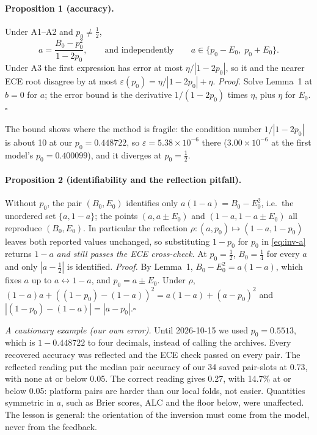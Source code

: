 \paragraph{Proposition 1 (accuracy).}
Under A1--A2 and $p_0\neq\frac12$,
\begin{equation}\label{eq:inv-a}
a=\frac{B_0-p_0^2}{1-2p_0},\qquad\text{and independently}\qquad a\in\{p_0-E_0,\;p_0+E_0\}.
\end{equation}
Under A3 the first expression has error at most $\eta/|1-2p_0|$, so it and the nearer ECE root disagree by at most
$\varepsilon(p_0)=\eta/|1-2p_0|+\eta$. \textit{Proof.} Solve Lemma~1 at $b=0$ for $a$; the error bound is the derivative
$1/(1-2p_0)$ times $\eta$, plus $\eta$ for $E_0$.\hfill$\square$

The bound shows where the method is fragile: the condition number $1/|1-2p_0|$ is about 10 at our $p_0=0.448722$,
so $\varepsilon=5.38\times10^{-6}$ there ($3.00\times10^{-6}$ at the first model's $p_0=0.400099$), and it diverges at $p_0=\frac12$.

\paragraph{Proposition 2 (identifiability and the reflection pitfall).}
Without $p_0$, the pair $(B_0,E_0)$ identifies only $a(1-a)=B_0-E_0^2$, i.e.\ the unordered set $\{a,1-a\}$; the
points $(a,a\pm E_0)$ and $(1-a,1-a\pm E_0)$ all reproduce $(B_0,E_0)$. In particular the reflection
$\rho:(a,p_0)\mapsto(1-a,1-p_0)$ leaves both reported values unchanged, so substituting $1-p_0$ for $p_0$ in
\eqref{eq:inv-a} returns $1-a$ \emph{and still passes the ECE cross-check}. At $p_0=\frac12$, $B_0=\frac14$ for every
$a$ and only $|a-\frac12|$ is identified. \textit{Proof.} By Lemma~1, $B_0-E_0^2=a(1-a)$, which fixes $a$ up to
$a\leftrightarrow1-a$, and $p_0=a\pm E_0$. Under $\rho$, $(1-a)a+((1-p_0)-(1-a))^2=a(1-a)+(a-p_0)^2$ and
$|(1-p_0)-(1-a)|=|a-p_0|$.\hfill$\square$

\emph{A cautionary example (our own error).} Until 2026-10-15 we used $p_0=0.5513$, which is $1-0.448722$ to four
decimals, instead of calling the archives. Every recovered accuracy was reflected and the ECE check passed on every
pair. The reflected reading put the median pair accuracy of our 34 saved pair-slots at 0.73, with none at or below
0.05. The correct reading gives 0.27, with 14.7\% at or below 0.05: platform pairs are harder than our local folds,
not easier. Quantities symmetric in $a$, such as Brier scores, ALC and the floor below, were unaffected. The lesson is
general: the orientation of the inversion must come from the model, never from the feedback.

